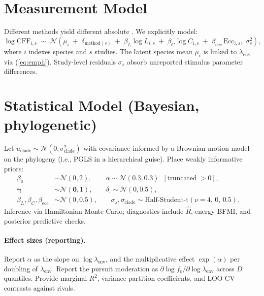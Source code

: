 \documentclass[11pt]{article}
\newcommand{\fc}{f_{\mathrm{c}}}             %
\newcommand{\cff}{\mathrm{CFF}}               %
\newcommand{\lamenv}{\lambda_{\mathrm{env}}}  %
\newcommand{\Lumin}{L}                        %
\newcommand{\Contrast}{C}                     %
\begin{document}
\section{Measurement Model}
\label{sec:measurement}
Different methods yield different absolute \cff. We explicitly model:
\begin{equation}
\label{eq:obsmodel}
\log \mathrm{CFF}_{i,s} \;\sim\; \mathcal{N}\!\left(\mu_i \;+\; \delta_{\text{method}(s)} \;+\; \beta_L \log \Lumin_{i,s} \;+\; \beta_C \log \Contrast_{i,s} \;+\; \beta_{\text{ecc}}\,\text{Ecc}_{i,s},\; \sigma_s^2\right),
\end{equation}
where $i$ indexes species and $s$ studies. The latent species mean $\mu_i$ is linked to $\lamenv$ via (\ref{eq:emph}). Study-level residuals $\sigma_s$ absorb unreported stimulus parameter differences.

\section{Statistical Model (Bayesian, phylogenetic)}
Let $u_{\text{clade}} \sim \mathcal{N}(0,\sigma_{\text{clade}}^2)$ with covariance informed by a Brownian-motion model on the phylogeny (i.e., PGLS in a hierarchical guise). Place weakly informative priors:
\begin{align*}
\beta_0 &\sim \mathcal{N}(0,2), \qquad
\alpha \sim \mathcal{N}(0.3,0.3)\;\;[\text{truncated } >0],\\
\bm{\gamma} &\sim \mathcal{N}(\bm{0}, 1), \qquad
\delta_{\cdot} \sim \mathcal{N}(0,0.5),\\
\beta_L,\beta_C,\beta_{\text{ecc}} &\sim \mathcal{N}(0,0.5), \qquad
\sigma_s,\sigma_{\text{clade}} \sim \mathrm{Half\text{-}Student\text{-}t}(\nu=4,\,0,\,0.5).
\end{align*}
Inference via Hamiltonian Monte Carlo; diagnostics include $\hat{R}$, energy-BFMI, and posterior predictive checks.

\paragraph{Effect sizes (reporting).} Report $\alpha$ as the slope on $\log\lamenv$, and the multiplicative effect $\exp(\alpha)$ per doubling of $\lamenv$. Report the pursuit moderation as $\partial \log \fc/\partial \log\lamenv$ across $D$ quantiles. Provide marginal $R^2$, variance partition coefficients, and LOO-CV contrasts against rivals.
\end{document}
